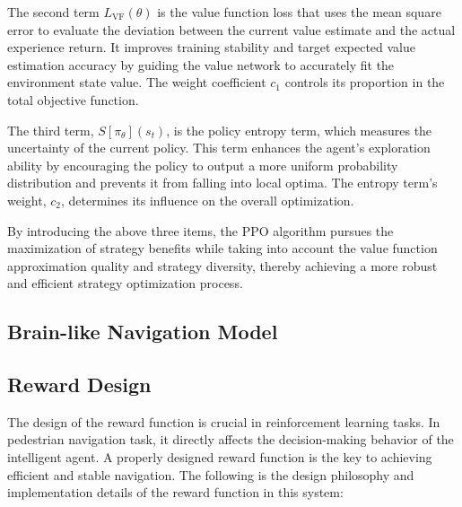 \documentclass[lettersize,journal]{IEEEtran}
\begin{document}
The second term $L_{\text{VF}}(\theta)$ is the value function loss that uses the mean square error to evaluate the deviation between the current value estimate and the actual experience return. 
It improves training stability and target expected value estimation accuracy by guiding the value network to accurately fit the environment state value. 
The weight coefficient $c_1$ controls its proportion in the total objective function.


The third term, $S[\pi_{\theta}](s_t)$, is the policy entropy term, which measures the uncertainty of the current policy. 
This term enhances the agent's exploration ability by encouraging the policy to output a more uniform probability distribution and prevents it from falling into local optima. 
The entropy term's weight, $c_2$, determines its influence on the overall optimization.


By introducing the above three items, the PPO algorithm pursues the maximization of strategy benefits while taking into account the value function approximation quality and strategy diversity, thereby achieving a more robust and efficient strategy optimization process.






\subsection{Brain-like Navigation Model}


\subsection{Reward Design} \label{sec:reward}

The design of the reward function is crucial in reinforcement learning tasks. 
In pedestrian navigation task, it directly affects the decision-making behavior of the intelligent agent. 
A properly designed reward function is the key to achieving efficient and stable navigation. 
The following is the design philosophy and implementation details of the reward function in this system:
\end{document}
